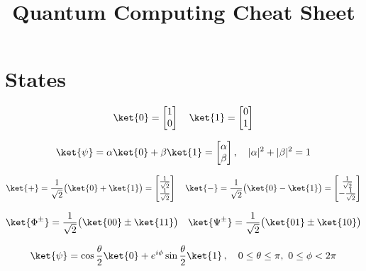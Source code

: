 \documentclass[12pt]{article}
\title{\vspace{-1.2cm}Quantum Computing Cheat Sheet}
\date{}
\begin{document}
\maketitle

\vspace{-36pt}
\section{States}

\begin{equation*}
\ket{0} = \begin{bmatrix} 1 \\ 0 \end{bmatrix}
\quad
\ket{1} = \begin{bmatrix} 0 \\ 1 \end{bmatrix}
\end{equation*}

\begin{equation*}
\ket{\psi} = \alpha \ket{0} + \beta \ket{1} = \begin{bmatrix} \alpha \\ \beta \end{bmatrix} ,
\quad
|\alpha|^2 + |\beta|^2 = 1
\end{equation*}

\begin{equation*}
\ket{+} = \frac{1}{\sqrt{2}} \big( \ket{0} + \ket{1} \big) 
= \begin{bmatrix} \frac{1}{\sqrt{2}} \\ \frac{1}{\sqrt{2}} \end{bmatrix}
\quad
\ket{-} = \frac{1}{\sqrt{2}} \big( \ket{0} - \ket{1} \big) 
= \begin{bmatrix} \frac{1}{\sqrt{2}} \\ -\frac{1}{\sqrt{2}} \end{bmatrix}
\end{equation*}

\begin{equation*}
\ket{\Phi^\pm} = \frac{1}{\sqrt{2}} \big( \ket{00} \pm \ket{11} \big)
\quad
\ket{\Psi^\pm} = \frac{1}{\sqrt{2}} \big( \ket{01} \pm \ket{10} \big)
\end{equation*}

\begin{equation*}
\ket{\psi} = \cos{\frac{\theta}{2}} \ket{0} + e^{i\phi} \sin{\frac{\theta}{2}} \ket{1} \, ,
\quad
0 \le \theta \le \pi, \
0 \le \phi < 2\pi
\end{equation*}
\end{document}
